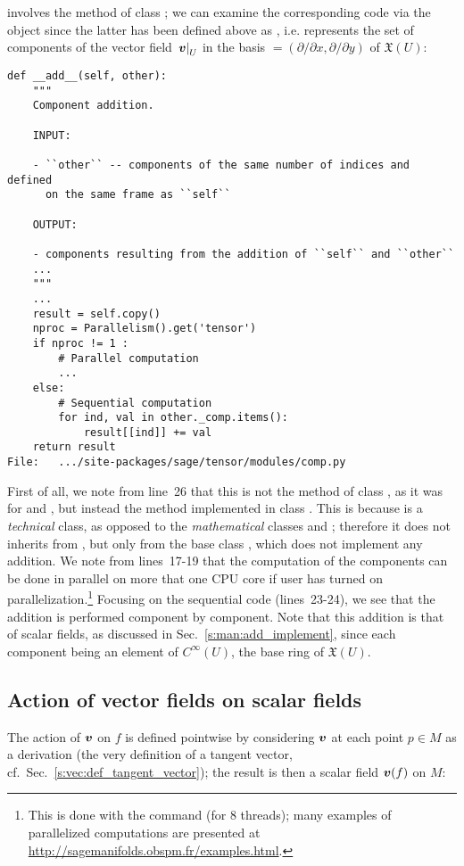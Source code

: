 involves the method  of class ; we
can examine the corresponding code via the object  since the
latter has been defined above as , i.e.
 represents the set of components of the vector field
$\left. \bm{v}\right| _U$ in the basis  $=(\partial/\partial x, \partial/\partial y)$
of $\mathfrak{X}(U)$:
\begin{lstlisting}
def __add__(self, other):
    """
    Component addition.

    INPUT:

    - ``other`` -- components of the same number of indices and defined
      on the same frame as ``self``

    OUTPUT:

    - components resulting from the addition of ``self`` and ``other``
    ...
    """
    ...
    result = self.copy()
    nproc = Parallelism().get('tensor')
    if nproc != 1 :
        # Parallel computation
        ...
    else:
        # Sequential computation
        for ind, val in other._comp.items():
            result[[ind]] += val
    return result
File:   .../site-packages/sage/tensor/modules/comp.py
\end{lstlisting}
First of all, we note from line~26
that this is not the method  of class ,
as it was for  and ,
but instead the method  implemented
in class . This is because  is a
\emph{technical} class, as opposed to the \emph{mathematical} classes
 and ; therefore it does not
inherits from , but only from the base class ,
which does not implement any addition.
We note from lines~17-19
that the computation of the components can be done in parallel on more that one CPU core if user has turned on parallelization.\footnote{This is done with the command
 (for 8 threads); many examples of
parallelized computations are presented at
\url{http://sagemanifolds.obspm.fr/examples.html}.}
Focusing on the sequential code (lines~23-24), we see that the addition is
performed component by component.
Note that this addition is that
of scalar fields, as discussed in Sec.~\ref{s:man:add_implement},
since each component being an element of $C^\infty(U)$, the base ring of $\mathfrak{X}(U)$.

\subsection{Action of vector fields on scalar fields} \label{s:vec:action_on_scalar}

The action of $\bm{v}$ on $f$ is defined pointwise by
considering $\bm{v}$ at each point $p\in M$ as a derivation (the very definition of a tangent vector,
cf.\ Sec.~\ref{s:vec:def_tangent_vector}); the result is then a scalar field $\bm{v}(f)$ on $M$:
